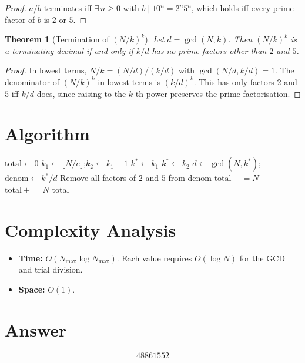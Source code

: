 \documentclass[12pt]{article}
\newtheorem{theorem}{Theorem}
\begin{document}
\begin{proof}
$a/b$ terminates iff $\exists\, n \ge 0$ with $b \mid 10^n = 2^n 5^n$, which holds iff every prime factor of $b$ is $2$ or $5$.
\end{proof}

\begin{theorem}[Termination of $(N/k)^k$]
Let $d = \gcd(N, k)$. Then $(N/k)^k$ is a terminating decimal if and only if $k/d$ has no prime factors other than $2$ and $5$.
\end{theorem}

\begin{proof}
In lowest terms, $N/k = (N/d)/(k/d)$ with $\gcd(N/d, k/d) = 1$. The denominator of $(N/k)^k$ in lowest terms is $(k/d)^k$. This has only factors $2$ and $5$ iff $k/d$ does, since raising to the $k$-th power preserves the prime factorisation.
\end{proof}

\section{Algorithm}

\begin{algorithmic}[1]
    \State $\mathrm{total} \gets 0$
        \State $k_1 \gets \lfloor N/e \rfloor$;\quad $k_2 \gets k_1 + 1$
            \State $k^* \gets k_1$
        \Else
            \State $k^* \gets k_2$
        \EndIf
        \State $d \gets \gcd(N, k^*)$;\quad $\mathrm{denom} \gets k^*/d$
        \State Remove all factors of $2$ and $5$ from $\mathrm{denom}$
            $\mathrm{total} \mathrel{-}= N$
        \Else\
            $\mathrm{total} \mathrel{+}= N$
        \EndIf
    \EndFor
    \State \Return total
\EndFunction
\end{algorithmic}

\section{Complexity Analysis}

\begin{itemize}
    \item \textbf{Time:} $O(N_{\max} \log N_{\max})$. Each value requires $O(\log N)$ for the GCD and trial division.
    \item \textbf{Space:} $O(1)$.
\end{itemize}

\section{Answer}

\[
\boxed{48861552}
\]
\end{document}
